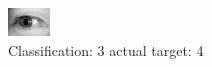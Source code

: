 \begin{figure}[h!]
\begin{center}
\includegraphics[width=0.60\columnwidth]{figures/ID3255_class_3_target_4.png}
\end{center}
\caption{ Classification: 3 actual target: 4}
\label{fig:ID3255_class_3_target_4}
\end{figure}
